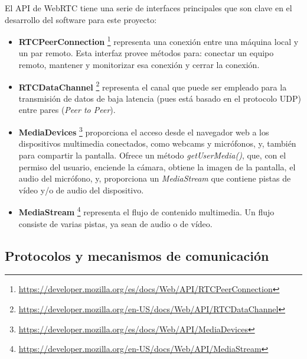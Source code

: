 \documentclass[a4paper, 12pt]{book}
\begin{document}
El API de WebRTC tiene una serie de interfaces principales que son clave en el desarrollo del software para este proyecto:

\begin{itemize}
\item \textbf{RTCPeerConnection} \footnote{\url{https://developer.mozilla.org/es/docs/Web/API/RTCPeerConnection}} representa una conexión entre una máquina local y un par remoto. Esta interfaz provee métodos para: conectar un equipo remoto, mantener y monitorizar esa conexión y cerrar la conexión.

\item \textbf{RTCDataChannel} \footnote{\url{https://developer.mozilla.org/en-US/docs/Web/API/RTCDataChannel}} representa el canal que puede ser empleado para la transmisión de datos de baja latencia (pues está basado en el protocolo UDP) entre pares (\textit{Peer to Peer}).

\item \textbf{MediaDevices} \footnote{\url{https://developer.mozilla.org/es/docs/Web/API/MediaDevices}} proporciona el acceso desde el navegador web a los dispositivos multimedia conectados, como webcams y micrófonos, y, también para compartir la pantalla. Ofrece un método \textit{getUserMedia()}, que, con el permiso del usuario, enciende la cámara, obtiene la imagen de la pantalla, el audio del micrófono, y, proporciona un \textit{MediaStream} que contiene pistas de vídeo y/o de audio del dispositivo.

\item \textbf{MediaStream} \footnote{\url{https://developer.mozilla.org/en-US/docs/Web/API/MediaStream}} representa el flujo de contenido multimedia. Un flujo consiste de varias pistas, ya sean de audio o de vídeo.
\end{itemize}

\subsection{Protocolos y mecanismos de comunicación}
\label{subsec:protocolos}
\end{document}

